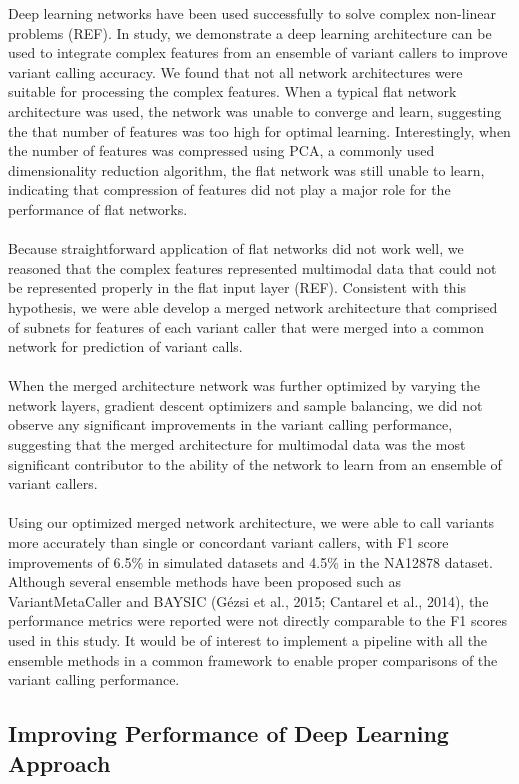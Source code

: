 \documentclass{article}
\begin{document}
Deep learning networks have been used successfully to solve complex non-linear problems (REF). In study, we demonstrate a deep learning architecture can be used to integrate complex features from an ensemble of variant callers to improve variant calling accuracy. We found that not all network architectures were suitable for processing the complex features. When a typical flat network architecture was used, the network was unable to converge and learn, suggesting the that number of features was too high for optimal learning. Interestingly, when the number of features was compressed using PCA, a commonly used dimensionality reduction algorithm, the flat network was still unable to learn, indicating that compression of features did not play a major role for the performance of flat networks.\\\\
Because straightforward application of flat networks did not work well, we reasoned that the complex features represented multimodal data that could not be represented properly in the flat input layer (REF). Consistent with this hypothesis, we were able develop a merged network architecture that comprised of subnets for features of each variant caller that were merged into a common network for prediction of variant calls.\\\\
When the merged architecture network was further optimized by varying the network layers, gradient descent optimizers and sample balancing, we did not observe any significant improvements in the variant calling performance, suggesting that the merged architecture for multimodal data was the most significant contributor to the ability of the network to learn from an ensemble of variant callers.\\\\
Using our optimized merged network architecture, we were able to call variants more accurately than single or concordant variant callers, with F1 score improvements of 6.5\% in simulated datasets and 4.5\% in the NA12878 dataset. Although several ensemble methods have been proposed such as VariantMetaCaller and BAYSIC (Gézsi et al., 2015; Cantarel et al., 2014), the performance metrics were reported were not directly comparable to the F1 scores used in this study. It would be of interest to implement a pipeline with all the ensemble methods in a common framework to enable proper comparisons of the variant calling performance.

\subsection{Improving Performance of Deep Learning Approach}
\end{document}
